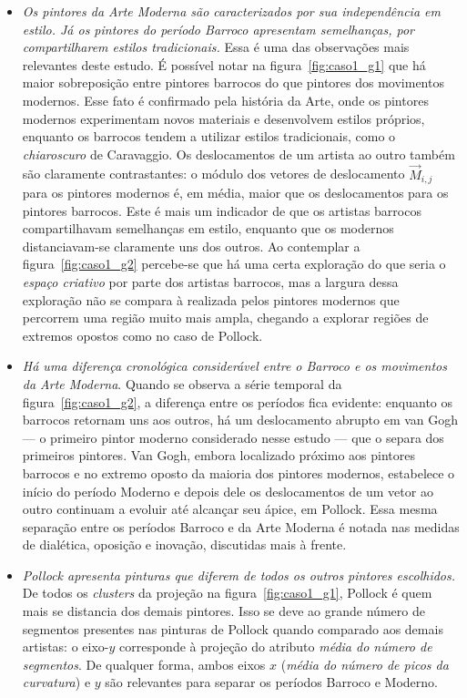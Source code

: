 \begin{itemize}
  \item \textit{Os pintores da Arte Moderna são caracterizados por sua
    independência em estilo. Já os pintores do período Barroco
    apresentam semelhanças, por compartilharem estilos tradicionais.}
    Essa é uma das observações mais relevantes deste estudo. É
    possível notar na figura~\ref{fig:caso1_g1} que há maior
    sobreposição entre pintores barrocos do que pintores dos
    movimentos modernos. Esse fato é confirmado pela história da Arte,
    onde os pintores modernos experimentam novos materiais e
    desenvolvem estilos próprios,
    enquanto os barrocos tendem a utilizar estilos tradicionais, como
    o \textit{chiaroscuro} de Caravaggio. Os deslocamentos de um
    artista ao outro também são claramente contrastantes: o módulo dos
    vetores de deslocamento $\vec{M}_{i,j}$ para os pintores modernos
    é, em média, maior que os deslocamentos para os pintores
    barrocos. Este é mais um indicador de que os artistas barrocos
    compartilhavam semelhanças em estilo, enquanto que os modernos
    distanciavam-se claramente uns dos outros. Ao contemplar a
    figura~\ref{fig:caso1_g2} percebe-se que há uma certa exploração
    do que seria o \textit{espaço criativo} por parte dos artistas
    barrocos, mas a largura dessa exploração não se compara à
    realizada pelos pintores modernos que percorrem uma região muito
    mais ampla, chegando a explorar regiões de extremos opostos como
    no caso de Pollock.

\item \textit{Há uma diferença cronológica considerável entre o
  Barroco e os movimentos da Arte Moderna}. Quando se observa a
  série temporal da figura~\ref{fig:caso1_g2}, a diferença entre os
  períodos fica evidente: enquanto os barrocos retornam uns aos
  outros, há um deslocamento abrupto em van Gogh --- o primeiro pintor
  moderno considerado nesse estudo --- que o separa dos primeiros
  pintores. Van Gogh, embora localizado próximo aos pintores barrocos
  e no extremo oposto da maioria dos pintores modernos, estabelece o
  início do período Moderno e depois dele os deslocamentos de um vetor
  ao outro continuam a evoluir até alcançar seu ápice, em Pollock. Essa
  mesma separação entre os períodos Barroco e da Arte Moderna é
  notada nas medidas de dialética, oposição e inovação, discutidas
  mais à frente.

  \item \textit{Pollock apresenta pinturas que diferem de todos os
    outros pintores escolhidos.} De todos os \textit{clusters} da
    projeção na figura~\ref{fig:caso1_g1}, Pollock é quem mais se
    distancia dos demais pintores. Isso se deve ao grande número de
    segmentos presentes nas pinturas de Pollock quando comparado aos
    demais artistas: o eixo-$y$ corresponde à projeção do atributo
    \emph{média do número de segmentos}. De qualquer forma, ambos
    eixos $x$ (\emph{média do número de picos da curvatura}) e $y$ são
    relevantes para separar os períodos Barroco e Moderno.


\end{itemize}
